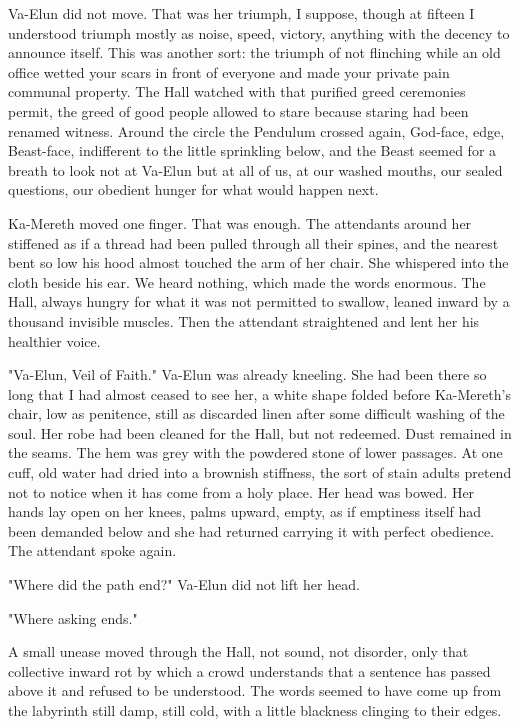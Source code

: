 Va-Elun did not move. That was her triumph, I suppose, though at fifteen I understood triumph mostly as noise, speed, victory, anything with the decency to announce itself. 
This was another sort: the triumph of not flinching while an old office wetted your scars in front of everyone and made your private pain communal property. 
The Hall watched with that purified greed ceremonies permit, the greed of good people allowed to stare because staring had been renamed witness. 
Around the circle the Pendulum crossed again, God-face, edge, Beast-face, indifferent to the little sprinkling below, 
and the Beast seemed for a breath to look not at Va-Elun but at all of us, at our washed mouths, our sealed questions, our obedient hunger for what would happen next. \par


Ka-Mereth moved one finger.
That was enough. 
The attendants around her stiffened as if a thread had been pulled through all their spines, and the nearest bent so low his hood almost touched the arm of her chair. 
She whispered into the cloth beside his ear. 
We heard nothing, which made the words enormous. 
The Hall, always hungry for what it was not permitted to swallow, leaned inward by a thousand invisible muscles. 
Then the attendant straightened and lent her his healthier voice. \par

"Va-Elun, Veil of Faith." Va-Elun was already kneeling. She had been there so long that I had almost ceased to see her, 
a white shape folded before Ka-Mereth’s chair, low as penitence, still as discarded linen after some difficult washing of the soul. 
Her robe had been cleaned for the Hall, but not redeemed. 
Dust remained in the seams. 
The hem was grey with the powdered stone of lower passages. 
At one cuff, old water had dried into a brownish stiffness, the sort of stain adults pretend not to notice when it has come from a holy place. 
Her head was bowed. 
Her hands lay open on her knees, palms upward, empty, as if emptiness itself had been demanded below and she had returned carrying it with perfect obedience.
The attendant spoke again. \par

"Where did the path end?" Va-Elun did not lift her head. \par
"Where asking ends." \par

A small unease moved through the Hall, not sound, not disorder, only that collective inward rot by which a crowd understands that a sentence has passed above 
it and refused to be understood. 
The words seemed to have come up from the labyrinth still damp, still cold, with a little blackness clinging to their edges. \par

